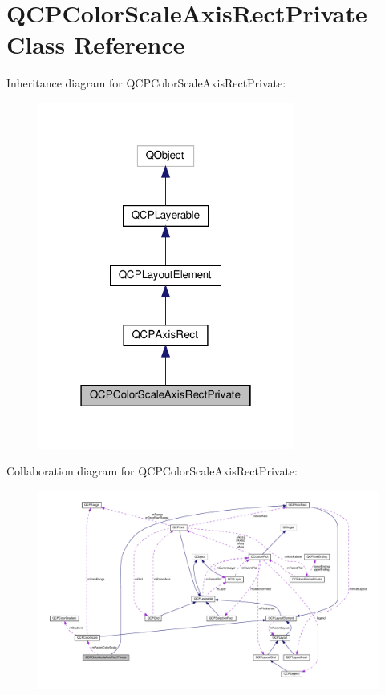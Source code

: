 \hypertarget{classQCPColorScaleAxisRectPrivate}{}\section{Q\+C\+P\+Color\+Scale\+Axis\+Rect\+Private Class Reference}
\label{classQCPColorScaleAxisRectPrivate}


Inheritance diagram for Q\+C\+P\+Color\+Scale\+Axis\+Rect\+Private\+:\nopagebreak
\begin{figure}[H]
\begin{center}
\leavevmode
\includegraphics[width=238pt]{classQCPColorScaleAxisRectPrivate__inherit__graph}
\end{center}
\end{figure}


Collaboration diagram for Q\+C\+P\+Color\+Scale\+Axis\+Rect\+Private\+:\nopagebreak
\begin{figure}[H]
\begin{center}
\leavevmode
\includegraphics[width=350pt]{classQCPColorScaleAxisRectPrivate__coll__graph}
\end{center}
\end{figure}
